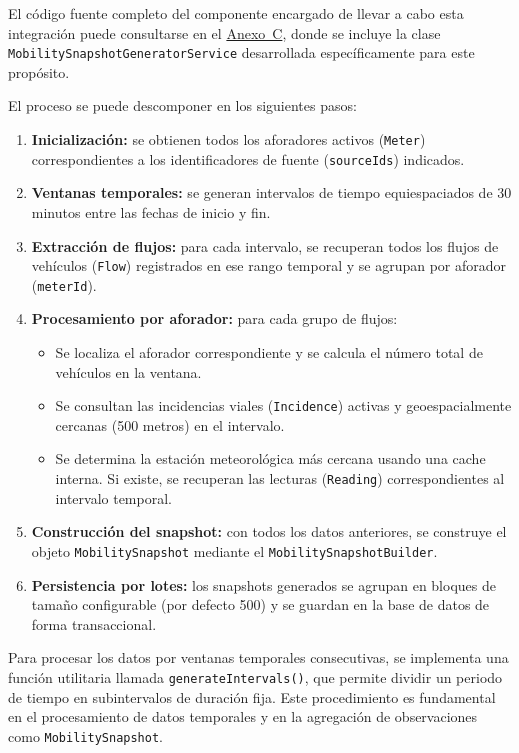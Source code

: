 El código fuente completo del componente encargado de llevar a cabo esta integración puede consultarse en el \hyperref[anexo:snapshot_generator]{Anexo~C}, donde se incluye la clase \texttt{MobilitySnapshotGeneratorService} desarrollada específicamente para este propósito.

El proceso se puede descomponer en los siguientes pasos:

\begin{enumerate}
	\item \textbf{Inicialización:} se obtienen todos los aforadores activos (\texttt{Meter}) correspondientes a los identificadores de fuente (\texttt{sourceIds}) indicados.
	\item \textbf{Ventanas temporales:} se generan intervalos de tiempo equiespaciados de 30 minutos entre las fechas de inicio y fin.
	\item \textbf{Extracción de flujos:} para cada intervalo, se recuperan todos los flujos de vehículos (\texttt{Flow}) registrados en ese rango temporal y se agrupan por aforador (\texttt{meterId}).
	\item \textbf{Procesamiento por aforador:} para cada grupo de flujos:
	\begin{itemize}
		\item Se localiza el aforador correspondiente y se calcula el número total de vehículos en la ventana.
		\item Se consultan las incidencias viales (\texttt{Incidence}) activas y geoespacialmente cercanas (500 metros) en el intervalo.
		\item Se determina la estación meteorológica más cercana usando una cache interna. Si existe, se recuperan las lecturas (\texttt{Reading}) correspondientes al intervalo temporal.
	\end{itemize}
	\item \textbf{Construcción del snapshot:} con todos los datos anteriores, se construye el objeto \texttt{MobilitySnapshot} mediante el \texttt{MobilitySnapshotBuilder}.
	\item \textbf{Persistencia por lotes:} los snapshots generados se agrupan en bloques de tamaño configurable (por defecto 500) y se guardan en la base de datos de forma transaccional.
\end{enumerate}

Para procesar los datos por ventanas temporales consecutivas, se implementa una función utilitaria llamada \texttt{generateIntervals()}, que permite dividir un periodo de tiempo en subintervalos de duración fija. Este procedimiento es fundamental en el procesamiento de datos temporales y en la agregación de observaciones como \texttt{MobilitySnapshot}.

